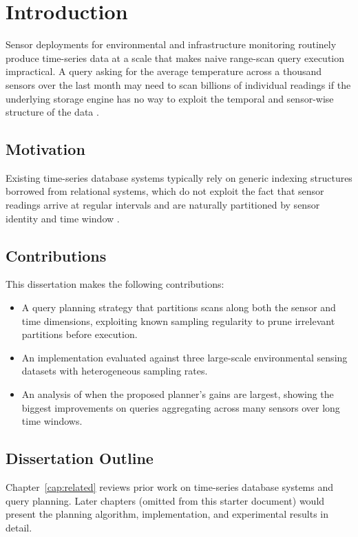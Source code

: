 \chapter{Introduction}
\label{cap:intro}

Sensor deployments for environmental and infrastructure monitoring routinely
produce time-series data at a scale that makes naive range-scan query
execution impractical. A query asking for the average temperature across a
thousand sensors over the last month may need to scan billions of
individual readings if the underlying storage engine has no way to exploit
the temporal and sensor-wise structure of the data \cite{Jensen2017}.

\section{Motivation}
Existing time-series database systems typically rely on generic indexing
structures borrowed from relational systems, which do not exploit the fact
that sensor readings arrive at regular intervals and are naturally
partitioned by sensor identity and time window \cite{Pelkonen2015}.

\section{Contributions}
This dissertation makes the following contributions:
\begin{itemize}
  \item A query planning strategy that partitions scans along both the
    sensor and time dimensions, exploiting known sampling regularity to
    prune irrelevant partitions before execution.
  \item An implementation evaluated against three large-scale environmental
    sensing datasets with heterogeneous sampling rates.
  \item An analysis of when the proposed planner's gains are largest,
    showing the biggest improvements on queries aggregating across many
    sensors over long time windows.
\end{itemize}

\section{Dissertation Outline}
Chapter~\ref{cap:related} reviews prior work on time-series database
systems and query planning. Later chapters (omitted from this starter
document) would present the planning algorithm, implementation, and
experimental results in detail.
